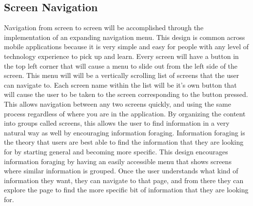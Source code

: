 \documentclass[onecolumn, draftclsnofoot,10pt, compsoc, tikz]{IEEEtran}
\begin{document}
\subsection{Screen Navigation}
Navigation from screen to screen will be accomplished through the implementation of an expanding navigation menu. This design is common across mobile applications because it is very simple and easy for people with any level of technology experience to pick up and learn. Every screen will have a button in the top left corner that will cause a menu to slide out from the left side of the screen. This menu will will be a vertically scrolling list of screens that the user can navigate to. Each screen name within the list will be it's own button that will cause the user to be taken to the screen corresponding to the button pressed. This allows navigation between any two screens quickly, and using the same process regardless of where you are in the application. By organizing the content into groups called screens, this allows the user to find information in a very natural way as well by encouraging information foraging. Information foraging is the theory that users are best able to find the information that they are looking for by starting general and becoming more specific. This design encourages information foraging by having an easily accessible menu that shows screens where similar information is grouped. Once the user understands what kind of information they want, they can navigate to that page, and from there they can explore the page to find the more specific bit of information that they are looking for.

\clearpage
\end{document}
